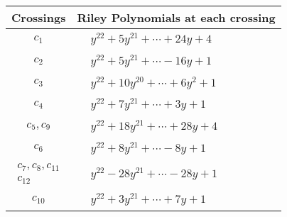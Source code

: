 \documentclass[1p]{elsarticle_modified}
\theoremstyle{definition}
\begin{document}
\begin{tabular}{m{50pt}|m{274pt}}
Crossings & \hspace{64pt}Riley Polynomials at each crossing \\
\hline $$\begin{aligned}c_{1}\end{aligned}$$&$\begin{aligned}
&y^{22}+5 y^{21}+\cdots+24 y+4
\end{aligned}$\\
\hline $$\begin{aligned}c_{2}\end{aligned}$$&$\begin{aligned}
&y^{22}+5 y^{21}+\cdots-16 y+1
\end{aligned}$\\
\hline $$\begin{aligned}c_{3}\end{aligned}$$&$\begin{aligned}
&y^{22}+10 y^{20}+\cdots+6 y^2+1
\end{aligned}$\\
\hline $$\begin{aligned}c_{4}\end{aligned}$$&$\begin{aligned}
&y^{22}+7 y^{21}+\cdots+3 y+1
\end{aligned}$\\
\hline $$\begin{aligned}c_{5},c_{9}\end{aligned}$$&$\begin{aligned}
&y^{22}+18 y^{21}+\cdots+28 y+4
\end{aligned}$\\
\hline $$\begin{aligned}c_{6}\end{aligned}$$&$\begin{aligned}
&y^{22}+8 y^{21}+\cdots-8 y+1
\end{aligned}$\\
\hline $$\begin{aligned}c_{7},c_{8},c_{11}\\c_{12}\end{aligned}$$&$\begin{aligned}
&y^{22}-28 y^{21}+\cdots-28 y+1
\end{aligned}$\\
\hline $$\begin{aligned}c_{10}\end{aligned}$$&$\begin{aligned}
&y^{22}+3 y^{21}+\cdots+7 y+1
\end{aligned}$\\
\hline
\end{tabular}\\~\\
\end{document}
